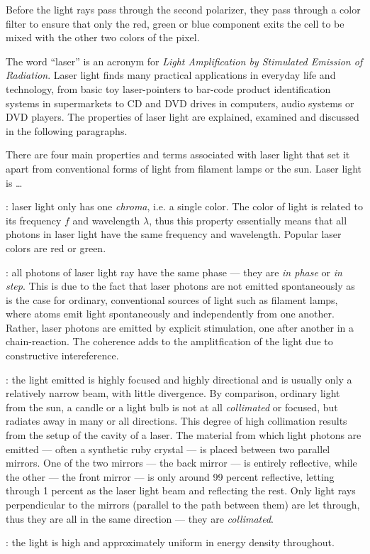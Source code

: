 Before the light rays pass through the second polarizer, they pass through a color filter to ensure that only the red, green or blue component exits the cell to be mixed with the other two colors of the pixel.


The word ``laser'' is an acronym for \emph{Light Amplification by Stimulated Emission of Radiation}. Laser light finds many practical applications in everyday life and technology, from basic toy laser-pointers to bar-code product identification systems in supermarkets to CD and DVD drives in computers, audio systems or DVD players. The properties of laser light are explained, examined and discussed in the following paragraphs.


There are four main properties and terms associated with laser light that set it apart from conventional forms of light from filament lamps or the sun. Laser light is \dots

\begin{itemize}
	
	: laser light only has one \emph{chroma}, i.e. a single color. The color of light is related to its frequency $f$ and wavelength $\lambda$, thus this property essentially means that all photons in laser light have the same frequency and wavelength. Popular laser colors are red or green.

	: all photons of laser light ray have the same phase --- they are \emph{in phase} or \emph{in step}. This is due to the fact that laser photons are not emitted spontaneously as is the case for ordinary, conventional sources of light such as filament lamps, where atoms emit light spontaneously and independently from one another. Rather, laser photons are emitted by explicit stimulation, one after another in a chain-reaction. The coherence adds to the amplitfication of the light due to constructive intereference.

	: the light emitted is highly focused and highly directional and is usually only a relatively narrow beam, with little divergence. By comparison, ordinary light from the sun, a candle or a light bulb is not at all \emph{collimated} or focused, but radiates away in many or all directions. This degree of high collimation results from the setup of the cavity of a laser. The material from which light photons are emitted --- often a synthetic ruby crystal --- is placed between two parallel mirrors. One of the two mirrors --- the back mirror --- is entirely reflective, while the other --- the front mirror --- is only around 99 percent reflective, letting through 1 percent as the laser light beam and reflecting the rest. Only light rays perpendicular to the mirrors (parallel to the path between them) are let through, thus they are all in the same direction --- they are \emph{collimated}.

	: the light is high and approximately uniform in energy density throughout.

\end{itemize}

